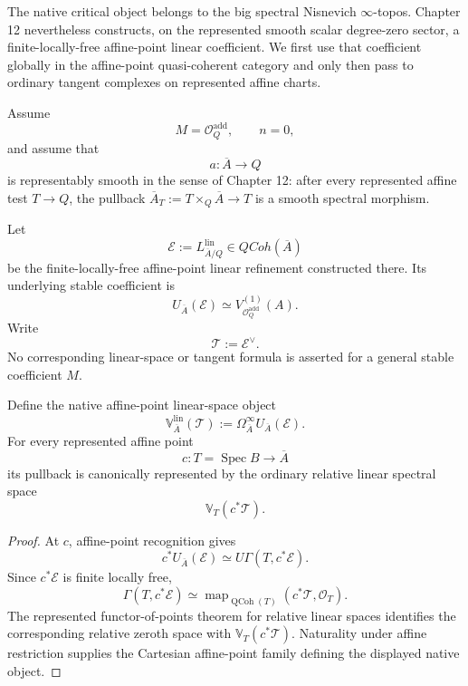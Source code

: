 The native critical object belongs to the big spectral Nisnevich $\infty$-topos.
Chapter 12 nevertheless constructs, on the represented smooth scalar degree-zero
sector, a finite-locally-free affine-point linear coefficient.  We first use that
coefficient globally in the affine-point quasi-coherent category and only then pass
to ordinary tangent complexes on represented affine charts.

\begin{convention}
\label{conv:symmetry-noether-represented-smooth-scalar-critical-domain}
Assume
\[
M=\mathcal O_Q^{\mathrm{add}},
\qquad
n=0,
\]
and assume that
\[
a:\overline A\longrightarrow Q
\]
is representably smooth in the sense of Chapter 12: after every represented affine
test $T\to Q$, the pullback
$\overline A_T:=T\times_Q\overline A\to T$ is a smooth spectral morphism.

Let
\[
\mathcal E
:=
L_{\overline A/Q}^{\mathrm{lin}}
\in
QCoh(\overline A)
\]
be the finite-locally-free affine-point linear refinement constructed there.  Its
underlying stable coefficient is
\[
U_{\overline A}(\mathcal E)
\simeq
V_{\mathcal O_Q^{\mathrm{add}}}^{(1)}(A).
\]
Write
\[
\mathcal T:=\mathcal E^\vee.
\]
No corresponding linear-space or tangent formula is asserted for a general stable
coefficient $M$.
\end{convention}

\begin{definition}
\label{def:symmetry-noether-affine-point-linear-space-object}
Define the native affine-point linear-space object
\[
\boxed{
\mathbb V_{\overline A}^{\mathrm{lin}}(\mathcal T)
:=
\Omega^\infty_{\overline A}
U_{\overline A}(\mathcal E).
}
\]
For every represented affine point
\[
c:T=\operatorname{Spec}B\longrightarrow\overline A
\]
its pullback is canonically represented by the ordinary relative linear spectral
space
\[
\mathbb V_T(c^*\mathcal T).
\]
\end{definition}

\begin{proof}
At $c$, affine-point recognition gives
\[
c^*U_{\overline A}(\mathcal E)
\simeq
U\Gamma(T,c^*\mathcal E).
\]
Since $c^*\mathcal E$ is finite locally free,
\[
\Gamma(T,c^*\mathcal E)
\simeq
\operatorname{map}_{\operatorname{QCoh}(T)}
(c^*\mathcal T,\mathcal O_T).
\]
The represented functor-of-points theorem for relative linear spaces identifies
the corresponding relative zeroth space with
$\mathbb V_T(c^*\mathcal T)$.  Naturality under affine restriction supplies the
Cartesian affine-point family defining the displayed native object.
\end{proof}

